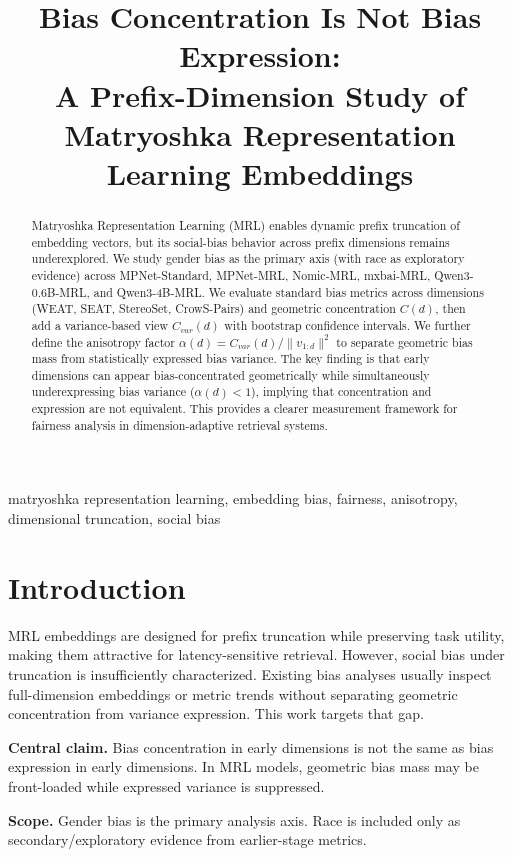 \documentclass[conference]{IEEEtran}
\title{Bias Concentration Is Not Bias Expression:\\A Prefix-Dimension Study of Matryoshka Representation Learning Embeddings}
\author{\IEEEauthorblockN{Anonymous Authors}}
\begin{document}
\maketitle

\begin{abstract}
Matryoshka Representation Learning (MRL) enables dynamic prefix truncation of embedding vectors, but its social-bias behavior across prefix dimensions remains underexplored. We study gender bias as the primary axis (with race as exploratory evidence) across MPNet-Standard, MPNet-MRL, Nomic-MRL, mxbai-MRL, Qwen3-0.6B-MRL, and Qwen3-4B-MRL. We evaluate standard bias metrics across dimensions (WEAT, SEAT, StereoSet, CrowS-Pairs) and geometric concentration $C(d)$, then add a variance-based view $C_{var}(d)$ with bootstrap confidence intervals. We further define the anisotropy factor $\alpha(d)=C_{var}(d)/\|v_{1:d}\|^2$ to separate geometric bias mass from statistically expressed bias variance. The key finding is that early dimensions can appear bias-concentrated geometrically while simultaneously underexpressing bias variance ($\alpha(d)<1$), implying that concentration and expression are not equivalent. This provides a clearer measurement framework for fairness analysis in dimension-adaptive retrieval systems.
\end{abstract}

\begin{IEEEkeywords}
matryoshka representation learning, embedding bias, fairness, anisotropy, dimensional truncation, social bias
\end{IEEEkeywords}

\section{Introduction}
MRL embeddings are designed for prefix truncation while preserving task utility, making them attractive for latency-sensitive retrieval. However, social bias under truncation is insufficiently characterized. Existing bias analyses usually inspect full-dimension embeddings or metric trends without separating geometric concentration from variance expression. This work targets that gap.

\textbf{Central claim.} Bias concentration in early dimensions is not the same as bias expression in early dimensions. In MRL models, geometric bias mass may be front-loaded while expressed variance is suppressed.

\textbf{Scope.} Gender bias is the primary analysis axis. Race is included only as secondary/exploratory evidence from earlier-stage metrics.
\end{document}
